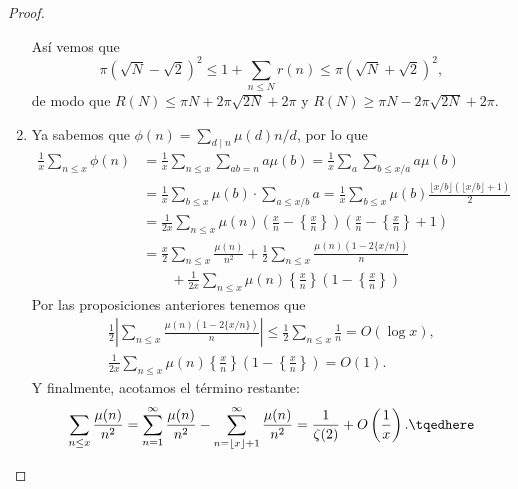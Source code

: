 \documentclass[teoria-numeros.tex]{subfiles}
\begin{document}
\begin{proof}
\begin{enumerate}
			Así vemos que
			$$ \pi\left(\sqrt{N} - \sqrt{2}\right)^2 \le 1 + \sum_{n\le N} r(n) \le \pi\left(\sqrt{N} + \sqrt{2}\right)^2, $$
			de modo que $R(N) \le \pi N + 2\pi\sqrt{2N} + 2\pi$ y $R(N) \ge \pi N - 2 \pi \sqrt{2N} + 2\pi$.

		\item Ya sabemos que $\phi(n) = \sum_{d\mid n} \mu(d) n/d$, por lo que
			\begin{align*}
				\frac{1}{x} \sum_{n\le x} \phi(n) &= \frac{1}{x} \sum_{n\le x} \sum_{ab=n} a \mu(b) = \frac{1}{x} \sum_{a} \sum_{b \le x/a} a \mu(b) \\
						      &= \frac{1}{x} \sum_{b \le x} \mu(b) \cdot \sum_{a \le x/b} a
						      = \frac{1}{x} \sum_{b\le x} \mu(b) \frac{\lfloor x/b \rfloor (\lfloor x/b \rfloor + 1)}{2} \\
						      &= \frac{1}{2x} \sum_{n\le x} \mu(n) \left( \frac xn - \left\{ \frac xn \right\} \right)
						      \left( \frac xn - \left\{ \frac xn \right\} + 1 \right) \\
						      &= \frac{x}{2} \sum_{n \le x} \frac{\mu(n)}{n^2}
						      + \frac{1}{2} \sum_{n\le x} \frac{\mu(n)(1 - 2\{ x/n \})}{n} \\
						      &\qquad {} + \frac{1}{2x} \sum_{n\le x} \mu(n) \left\{ \frac xn \right\}
						      \left(1 - \left\{ \frac xn \right\}\right)
			\end{align*}
			Por las proposiciones anteriores tenemos que
			\begin{gather*}
				\frac{1}{2} \left| \sum_{n\le x} \frac{\mu(n)(1 - 2\{ x/n \})}{n} \right| \le \frac{1}{2} \sum_{n\le x} \frac{1}{n} = O(\log x), \\
				\frac{1}{2x} \sum_{n\le x} \mu(n) \left\{ \frac xn \right\}\left(1 - \left\{ \frac xn \right\}\right) = O(1).
			\end{gather*}
			Y finalmente, acotamos el término restante:
			\begin{equation}
				\sum_{n \le x} \frac{\mu(n)}{n^2} = \sum_{n=1}^{\infty} \frac{\mu(n)}{n^2}
				- \sum_{n=\lfloor x \rfloor +1}^{\infty} \frac{\mu(n)}{n^2} \notag
								  = \frac{1}{\zeta(2)} + O\left( \frac{1}{x} \right).
								  \tqedhere
			\end{equation}
	\end{enumerate}
\end{proof}
\end{document}
